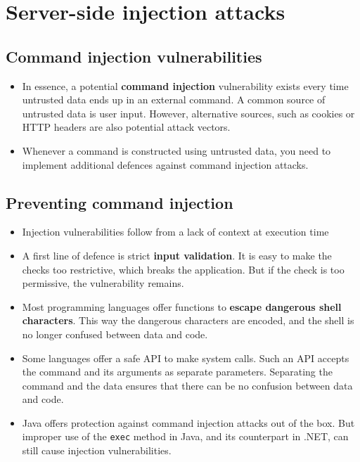 \documentclass[../main.tex]{subfiles}
\begin{document}
\section{Server-side injection attacks }
\subsection{Command injection vulnerabilities}
\begin{itemize}
\item In essence, a potential \textbf{command injection} vulnerability exists every time untrusted data ends up in an external command. A common source of untrusted data is user input. However, alternative sources, such as cookies or HTTP headers are also potential attack vectors.
\item Whenever a command is constructed using untrusted data, you need to implement additional defences against command injection attacks.
\end{itemize}

\subsection{Preventing command injection}
\begin{itemize}
\item Injection vulnerabilities follow from a lack of context at execution time
\item A first line of defence is strict \textbf{input validation}. It is easy to make the checks too restrictive, which breaks the application. But if the check is too permissive, the vulnerability remains.
\item Most programming languages offer functions to \textbf{escape dangerous shell characters}. This way the dangerous characters are encoded, and the shell is no longer confused between data and code.
\item Some languages offer a safe API to make system calls. Such an API accepts the command and its arguments as separate parameters. Separating the command and the data ensures that there can be no confusion between data and code.
\item Java offers protection against command injection attacks out of the box. But improper use of the \texttt{exec} method in Java, and its counterpart in .NET, can still cause injection vulnerabilities.
\end{itemize}
\end{document}
